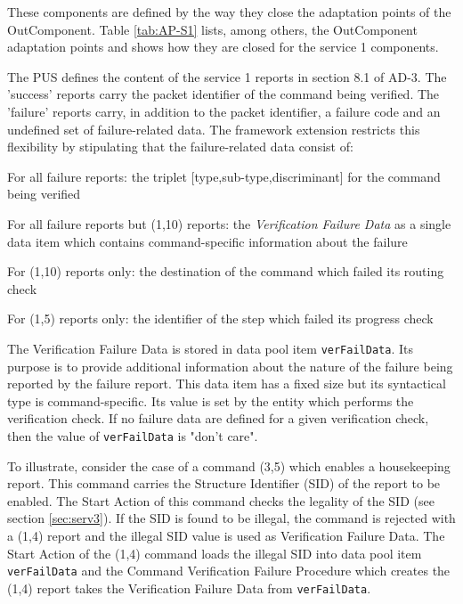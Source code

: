 \documentclass[a4paper,10pt]{article}
\newenvironment{fw_itemize}						%
{\begin{itemize}
  \setlength{\itemsep}{1mm}
  \setlength{\parskip}{0pt}
  \setlength{\parsep}{0pt}}
{\end{itemize}}
\begin{document}
These components are defined by the way they close the adaptation points of the OutComponent. Table \ref{tab:AP-S1} lists, among others, the OutComponent adaptation points and shows how they are closed for the service 1 components.

The PUS defines the content of the service 1 reports in section 8.1 of AD-3. The 'success' reports carry the packet identifier of the command being verified. The 'failure' reports carry, in addition to the packet identifier, a failure code and an undefined set of failure-related data. The framework extension restricts this flexibility by stipulating that the failure-related data consist of: 

\begin{fw_itemize}
\item For all failure reports: the triplet [type,sub-type,discriminant] for the command being verified
\item For all failure reports but (1,10) reports: the \textit{Verification Failure Data} as a single data item which contains command-specific information about the failure 
\item For (1,10) reports only: the destination of the command which failed its routing check
\item For (1,5) reports only: the identifier of the step which failed its progress check
\end{fw_itemize}

The Verification Failure Data is stored in data pool item \texttt{verFailData}. Its purpose is to provide additional information about the nature of the failure being reported by the failure report. This data item has a fixed size but its syntactical type is command-specific. Its value is set by the entity which performs the verification check. If no failure data are defined for a given verification check, then the value of \texttt{verFailData} is "don't care". 

To illustrate, consider the case of a command (3,5) which enables a housekeeping report. This command carries the Structure Identifier (SID) of the report to be enabled. The Start Action of this command checks the legality of the SID (see section \ref{sec:serv3}). If the SID is found to be illegal, the command is rejected with a (1,4) report and the illegal SID value is used as Verification Failure Data. The Start Action of the (1,4) command loads the illegal SID into data pool item \texttt{verFailData} and the Command Verification Failure Procedure which creates the (1,4) report takes the Verification Failure Data from \texttt{verFailData}.
\end{document}
